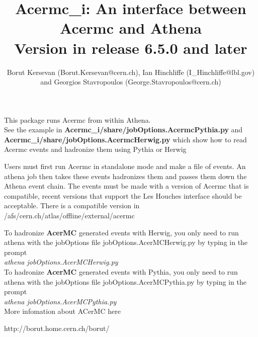 \documentclass[11pt]{article}
\begin{document}
\title{Acermc\_i: An interface between Acermc and Athena\\
Version in release 6.5.0 and later}
\author{  Borut Kersevan (Borut.Kersevan@cern.ch), Ian Hinchliffe (I\_Hinchliffe@lbl.gov) and Georgios Stavropoulos (George.Stavropoulos@cern.ch) }

\maketitle           

This package runs Acermc  from within Athena. \\See the example
in {\bf Acermc\_i/share/jobOptions.AcermcPythia.py } and {\bf
  Acermc\_i/share/jobOptions.AcermcHerwig.py }  which show how to
read Acermc events and hadronize them using Pythia or Herwig

Users must first run 
Acermc in standalone mode and make a file of events. An athena job
then takes these events hadronizes them and passes them down the
Athena event chain. The events must be made with a version of Acermc
that is compatible, recent versions that support the Les Houches
interface should be acceptable. There is a compatible version in  /afs/cern.ch/atlas/offline/external/acermc


To hadronize {\bf AcerMC} generated events with Herwig, you only need to run athena with the jobOptions
file jobOptions.AcerMCHerwig.py by typing in the prompt \\
{\it athena jobOptions.AcerMCHerwig.py}\\

To hadronize {\bf AcerMC} generated events with Pythia, you only need to run athena with the jobOptions
file jobOptions.AcerMCPythia.py by typing in the prompt \\
{\it athena jobOptions.AcerMCPythia.py}\\


More infomation about ACerMC  here

http://borut.home.cern.ch/borut/
\end{document}
